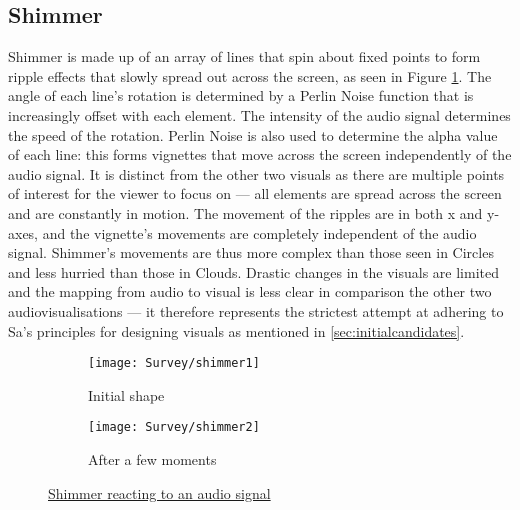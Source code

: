 \documentclass[../initial_thesis.tex]{subfiles}
\begin{document}
\subsection{Shimmer}
Shimmer is made up of an array of lines that spin about fixed points to form ripple effects that slowly spread out across the screen, as seen in Figure \ref{fig:shimmer1}. The angle of each line's rotation is determined by a Perlin Noise function that is increasingly offset with each element. The intensity of the audio signal determines the speed of the rotation. Perlin Noise is also used to determine the alpha value of each line: this forms vignettes that move across the screen independently of the audio signal. It is distinct from the other two visuals as there are multiple points of interest for the viewer to focus on --- all elements are spread across the screen and are constantly in motion. The movement of the ripples are in both x and y-axes, and the vignette's movements are completely independent of the audio signal. Shimmer's movements are thus more complex than those seen in Circles and less hurried than those in Clouds. Drastic changes in the visuals are limited and the mapping from audio to visual is less clear in comparison the other two audiovisualisations --- it therefore represents the strictest attempt at adhering to Sa's principles for designing visuals as mentioned in \ref{sec:initialcandidates}. 

\begin{figure}
  \begin{subfigure}{0.5\textwidth}
    \texttt{[image: Survey/shimmer1]}
    \caption{Initial shape}
  \end{subfigure} 
  \begin{subfigure}{0.5\textwidth}
    \texttt{[image: Survey/shimmer2]}
    \caption{After a few moments}
  \end{subfigure}
  \caption{\href{https://vimeo.com/327859350}{Shimmer reacting to an audio signal}}
  \label{fig:shimmer1}
\end{figure}
\end{document}
